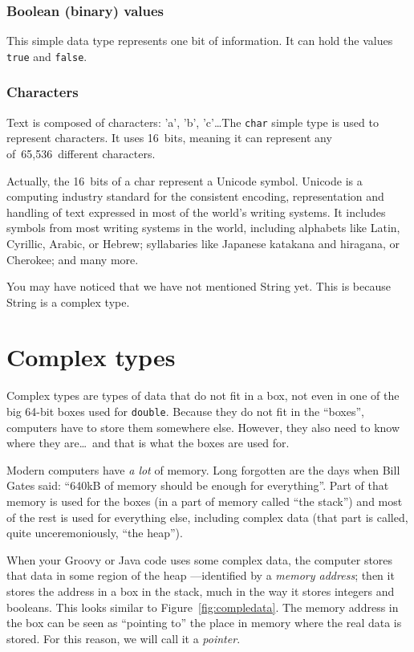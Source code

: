 \subsubsection{Boolean (binary) values}
\label{sec:bool-binary-valu}

This simple data type represents one bit of information. It can hold
the values \verb+true+ and \verb+false+. 

\subsubsection{Characters}
\label{sec:characters}

Text is composed of characters: 'a', 'b', 'c'\ldots The \verb+char+
simple type is
used to represent characters. It uses 16~bits, meaning it can
represent any of~65,536~different characters. 

Actually, the 16~bits of a char represent a Unicode symbol. Unicode is
a computing industry standard for the consistent encoding,
representation and handling of text expressed in most of the world's
writing systems. It includes symbols from most writing systems in
the world, including alphabets like Latin, Cyrillic, Arabic, or
Hebrew; syllabaries like Japanese katakana and hiragana, or
Cherokee; and many more. 

You may have noticed that we have not mentioned String yet. This is
because String is a complex type. 

\section{Complex types}
\label{sec:complex-types}

Complex types are types of data that do not fit in a box, not even in
one of the big 64-bit boxes used for \verb+double+. Because they do
not fit in the ``boxes'', computers have to store them somewhere
else. However, they also need to know where they are\ldots~and that is
what the boxes are used for. 

Modern computers have \emph{a lot} of memory. Long forgotten are the
days when Bill Gates said: ``640kB of memory should be enough for
everything''. Part of that memory is used for the boxes (in a part of
memory called ``the stack'') and most of the rest is used for
everything else, including complex data (that part is called, quite
unceremoniously, ``the heap''). 

When your Groovy or Java code uses some complex data, the computer
stores that data in some region of the heap ---identified by a \emph{memory
  address}; then it stores the address in a box in the stack, much in
the way it stores integers and booleans. This looks similar to
Figure~\ref{fig:compledata}. The memory address in the box can be seen
as ``pointing to'' the place in memory where the real data is
stored. For this reason, we will call it a \emph{pointer}. 

